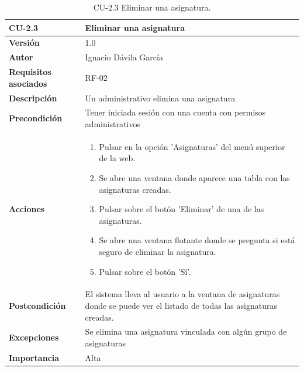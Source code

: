 \begin{table}[p]
	\centering
	\begin{tabularx}{\linewidth}{ p{} p{} }
		\toprule
		\textbf{CU-2.3}    & \textbf{Eliminar una asignatura}\\
		\toprule
		\textbf{Versión}              & 1.0    \\
		\textbf{Autor}                & Ignacio Dávila García \\
		\textbf{Requisitos asociados} & RF-02 \\
		\textbf{Descripción}          & Un administrativo elimina una asignatura \\
		\textbf{Precondición}         & Tener iniciada sesión con una cuenta con permisos administrativos \\
		\textbf{Acciones}             &
		\begin{enumerate}
			\def\labelenumi{\arabic{enumi}.}
			\tightlist
			\item Pulsar en la opción 'Asignaturas' del menú superior de la web.
			\item Se abre una ventana donde aparece una tabla con las asignaturas creadas.
			\item Pulsar sobre el botón 'Eliminar' de una de las asignaturas.
			\item Se abre una ventana flotante donde se pregunta si está seguro de eliminar la asignatura.
			\item Pulsar sobre el botón 'Sí'.
		\end{enumerate}\\
		\textbf{Postcondición}        & El sistema lleva al usuario a la ventana de asignaturas donde se puede ver el listado de todas las asignaturas creadas. \\
		\textbf{Excepciones}          & Se elimina una asignatura vinculada con algún grupo de asignaturas \\
		\textbf{Importancia}          & Alta \\
		\bottomrule
	\end{tabularx}
	\caption{CU-2.3 Eliminar una asignatura.}
\end{table}

